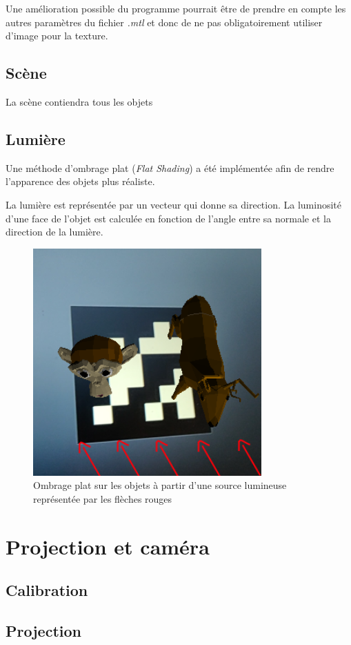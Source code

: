             Une amélioration possible du programme pourrait être de prendre en compte les autres paramètres du fichier \emph{.mtl} et donc de ne pas obligatoirement utiliser d'image pour la texture.

        \subsection{Scène}

        La scène contiendra tous les objets 


        \subsection{Lumière}
        \label{subsubsec:lumiere}

        Une méthode d'ombrage plat (\textit{Flat Shading}) a été implémentée afin de rendre l'apparence des objets plus réaliste.

        La lumière est représentée par un vecteur qui donne sa direction. La luminosité d'une face de l'objet est calculée en fonction de l'angle entre sa normale et la direction de la lumière.

        \begin{figure}[!h]
            \centering
            \includegraphics[scale=0.5]{img/flat_shading.png}
            \caption{Ombrage plat sur les objets à partir d'une source lumineuse représentée par les flèches rouges}
        \end{figure}

    \section{Projection et caméra}

        \subsection{Calibration}
        
        \subsection{Projection}
